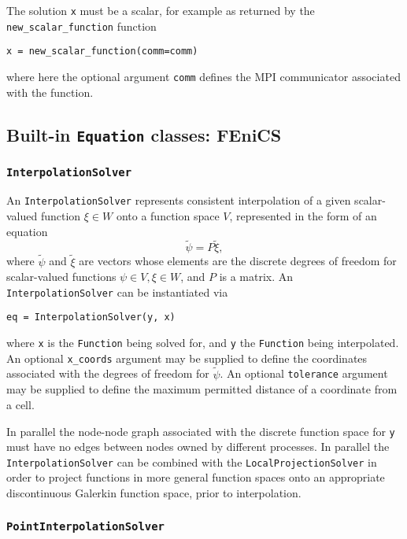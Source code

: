 \documentclass[11pt]{article}
\begin{document}
The solution \texttt{x} must be a scalar, for example as returned by the
\texttt{new\_scalar\_function} function
\begin{lstlisting}
x = new_scalar_function(comm=comm)
\end{lstlisting}
where here the optional argument \texttt{comm} defines the MPI communicator
associated with the function.

\subsection{Built-in \texttt{Equation} classes: FEniCS}

\subsubsection{\texttt{InterpolationSolver}}\label{sect:InterpolationSolver}

An \texttt{InterpolationSolver} represents consistent interpolation of a given
scalar-valued function $\xi \in W$ onto a function space $V$, represented in
the form of an equation
\begin{equation*}
  \tilde{\psi} = P \tilde{\xi},
\end{equation*}
where $\tilde{\psi}$ and $\tilde{\xi}$ are vectors whose elements are the
discrete degrees of freedom for scalar-valued functions
$\psi \in V, \xi \in W$, and $P$ is a matrix. An \texttt{InterpolationSolver}
can be instantiated via
\begin{lstlisting}
eq = InterpolationSolver(y, x)
\end{lstlisting}
where \texttt{x} is the \texttt{Function} being solved for, and \texttt{y} the
\texttt{Function} being interpolated. An optional \texttt{x\_coords} argument
may be supplied to define the coordinates associated with the degrees of
freedom for $\tilde{\psi}$. An optional \texttt{tolerance} argument may be
supplied to define the maximum permitted distance of a coordinate from a cell.

In parallel the node-node graph associated with the discrete function space for
\texttt{y} must have no edges between nodes owned by different processes. In
parallel the \texttt{InterpolationSolver} can be combined with the
\texttt{LocalProjectionSolver} in order to project functions in more general
function spaces onto an appropriate discontinuous Galerkin function space,
prior to interpolation.

\subsubsection{\texttt{PointInterpolationSolver}}
\end{document}
